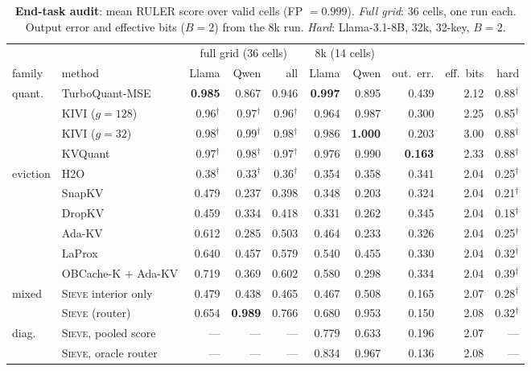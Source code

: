 \documentclass{article}
\newif\ifshowest \showesttrue
\DeclareRobustCommand{\est}[1]{\ifshowest{\color{estcol}#1$^{\dagger}$}\else---\fi}
\DeclareRobustCommand{\estalt}[2]{\ifshowest#1\else#2\fi}
\newcommand{\sieve}{\textsc{Sieve}}
\theoremstyle{definition}
\begin{document}
\begin{table}[t]
\centering
\footnotesize
\setlength{\tabcolsep}{2.6pt}
\caption{\textbf{End-task audit}: mean RULER score over valid cells (FP $=0.999$). \emph{Full grid}: 36 cells, one run each. 
Output error and effective bits ($B=2$) from the 8k run. \emph{Hard}: Llama-3.1-8B, 32k, 32-key, $B=2$. 
}
\label{tab:endtask}
\begin{tabular}{@{}llrrrrrrrr@{}}
\toprule
& & \multicolumn{3}{c}{full grid (36 cells)} & \multicolumn{2}{c}{8k (14 cells)} & & & \\
\cmidrule(lr){3-5}\cmidrule(lr){6-7}
family & method & Llama & Qwen & all & Llama & Qwen & out.\ err. & eff.\ bits & hard \\
\midrule
\multirow{4}{*}{quant.} & TurboQuant-MSE & \textbf{0.985} & 0.867 & 0.946 & \textbf{0.997} & 0.895 & 0.439 & 2.12 & \est{0.88} \\
 & KIVI ($g{=}128$) & \est{0.96} & \est{0.97} & \est{0.96} & 0.964 & 0.987 & 0.300 & 2.25 & \est{0.85} \\
 & KIVI ($g{=}32$) & \est{0.98} & \est{0.99} & \est{0.98} & 0.986 & \textbf{1.000} & 0.203 & 3.00 & \est{0.88} \\
 & KVQuant & \est{0.97} & \est{0.98} & \est{0.97} & 0.976 & 0.990 & \textbf{0.163} & 2.33 & \est{0.88} \\
\midrule
\multirow{6}{*}{eviction} & H2O & \est{0.38} & \est{0.33} & \est{0.36} & 0.354 & 0.358 & 0.341 & 2.04 & \est{0.25} \\
 & SnapKV & 0.479 & 0.237 & 0.398 & 0.348 & 0.203 & 0.324 & 2.04 & \est{0.21} \\
 & DropKV & 0.459 & 0.334 & 0.418 & 0.331 & 0.262 & 0.345 & 2.04 & \est{0.18} \\
 & Ada-KV & 0.612 & 0.285 & 0.503 & 0.464 & 0.233 & 0.326 & 2.04 & \est{0.25} \\
 & LaProx & 0.640 & 0.457 & 0.579 & 0.540 & 0.455 & 0.330 & 2.04 & \est{0.32} \\
 & OBCache-K + Ada-KV & 0.719 & 0.369 & 0.602 & 0.580 & 0.298 & 0.334 & 2.04 & \est{0.39} \\
\midrule
\multirow{2}{*}{mixed} & \sieve{} interior only & 0.479 & 0.438 & 0.465 & 0.467 & 0.508 & 0.165 & 2.07 & \est{0.28} \\
 & \sieve{} (router) & 0.654 & \textbf{0.989} & 0.766 & 0.680 & 0.953 & 0.150 & 2.08 & \est{0.32} \\
\midrule
\multirow{2}{*}{diag.} & \sieve{}, pooled score & --- & --- & --- & 0.779 & 0.633 & 0.196 & 2.07 & --- \\
 & \sieve{}, oracle router & --- & --- & --- & 0.834 & 0.967 & 0.136 & 2.08 & --- \\
\bottomrule
\end{tabular}
\vspace{-2mm}
\end{table}
\end{document}
